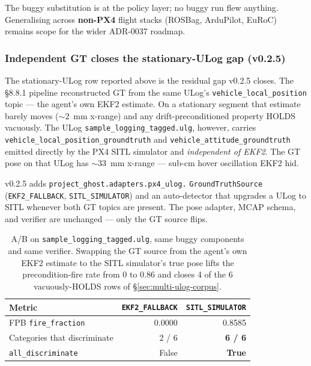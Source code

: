 \documentclass[11pt,a4paper]{article}
\begin{document}
The buggy substitution is at the policy layer; no buggy run
flew anything. Generalising across \textbf{non-PX4} flight
stacks (ROSBag, ArduPilot, EuRoC) remains scope for the wider
ADR-0037 roadmap.

\subsubsection*{Independent GT closes the stationary-ULog gap (v0.2.5)}
\label{sec:independent-gt}

The stationary-ULog row reported above is the residual gap
v0.2.5 closes. The §8.8.1 pipeline reconstructed GT from the
same ULog's \texttt{vehicle\_local\_position} topic --- the
agent's own EKF2 estimate. On a stationary segment that estimate
barely moves ($\sim$2~mm x-range) and any drift-preconditioned
property HOLDS vacuously. The ULog
\texttt{sample\_logging\_tagged.ulg}, however, carries
\texttt{vehicle\_local\_position\_groundtruth} and
\texttt{vehicle\_attitude\_groundtruth} emitted directly by the
PX4 SITL simulator and \emph{independent of EKF2}. The GT pose
on that ULog has $\sim$33~mm x-range --- sub-cm hover oscillation
EKF2 hid.

v0.2.5 adds \texttt{project\_ghost.adapters.px4\_ulog.}
\texttt{GroundTruthSource} (\texttt{EKF2\_FALLBACK},
\texttt{SITL\_SIMULATOR}) and an auto-detector that upgrades a
ULog to SITL whenever both GT topics are present. The pose
adapter, MCAP schema, and verifier are unchanged --- only the
GT source flips.

\begin{table}[h]
\centering\small
\begin{tabular}{l r r}
\toprule
\textbf{Metric} & \texttt{EKF2\_FALLBACK} & \texttt{SITL\_SIMULATOR} \\
\midrule
FPB \texttt{fire\_fraction}     & 0.0000 & 0.8585 \\
Categories that discriminate    & 2 / 6  & \textbf{6 / 6} \\
\texttt{all\_discriminate}      & False  & \textbf{True}  \\
\bottomrule
\end{tabular}
\caption{A/B on \texttt{sample\_logging\_tagged.ulg}, same buggy
components and same verifier. Swapping the GT source from the
agent's own EKF2 estimate to the SITL simulator's true pose
lifts the precondition-fire rate from 0 to 0.86 and closes 4 of
the 6 vacuously-HOLDS rows of \S\ref{sec:multi-ulog-corpus}.}
\label{tab:independent-gt-ab}
\end{table}
\end{document}
